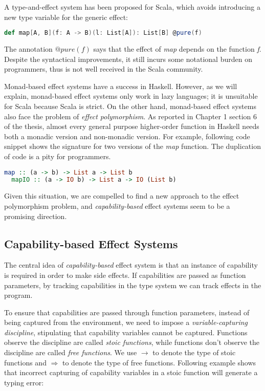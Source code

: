 A type-and-effect system has been proposed for
Scala\cite{lukas2014effect}, which avoids introducing a new type
variable for the generic effect:

\begin{lstlisting}[language=Scala]
def map[A, B](f: A -> B)(l: List[A]): List[B] @pure(f)
\end{lstlisting}

The annotation $@pure(f)$ says that the effect of \emph{map} depends
on the function \emph{f}. Despite the syntactical improvements, it
still incurs some notational burden on programmers, thus is not well
received in the Scala community.

Monad-based effect systems have a success in Haskell. However, as we
will explain, monad-based effect systems only work in lazy languages;
it is unsuitable for Scala because Scala is strict. On the other hand,
monad-based effect systems also face the problem of \emph{effect
  polymorphism}. As reported in Chapter 1 section 6 of the
thesis\cite{lippmeier2009type}, almost every general purpose
higher-order function in Haskell needs both a monadic version and
non-monadic version. For example, following code snippet shows the
signature for two versions of the \emph{map} function. The duplication
of code is a pity for programmers.

\begin{lstlisting}[language=Haskell]
  map :: (a -> b) -> List a -> List b
  mapIO :: (a -> IO b) -> List a -> IO (List b)
\end{lstlisting}

Given this situation, we are compelled to find a new approach to the
effect polymorphism problem, and \emph{capability-based} effect
systems seem to be a promising direction.

\subsection{Capability-based Effect Systems}

The central idea of \emph{capability-based} effect system is that an
instance of capability is required in order to make side effects. If
capabilities are passed as function parameters, by tracking
capabilities in the type system we can track effects in the program.

To ensure that capabilities are passed through function parameters,
instead of being captured from the environment, we need to impose a
\emph{variable-capturing discipline}, stipulating that capability
variables cannot be captured. Functions observe the discipline are
called \emph{stoic functions}, while functions don't observe the
discipline are called \emph{free functions}. We use $\to$ to denote
the type of stoic functions and $\Rightarrow$ to denote the type of
free functions. Following example shows that incorrect capturing of
capability variables in a stoic function will generate a typing error:

